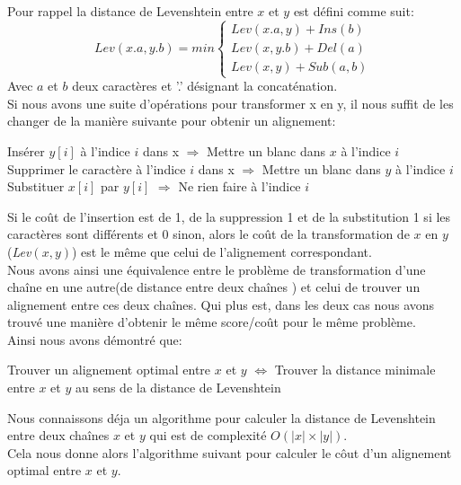 \documentclass{article}
\begin{document}
Pour rappel la distance de Levenshtein entre $x$ et $y$ est défini comme suit:
\begin{equation*}
	Lev(x.a,y.b)= min
		\begin{cases}
			Lev(x.a,y) + Ins(b)\\
			Lev(x,y.b) + Del(a)\\
			Lev(x,y) + Sub(a,b)
		\end{cases}
\end{equation*}
Avec $a$ et $b$ deux caractères et '.' désignant la concaténation.\\

Si nous avons une suite d'opérations pour transformer x en y, il nous suffit de
les changer de la manière suivante pour obtenir un alignement:
\begin{center}
	Insérer $y[i]$ à l'indice $i$ dans x  $\Rightarrow$ Mettre un blanc dans $x$ à l'indice $i$ \\
	Supprimer le caractère à l'indice $i$ dans x $\Rightarrow$ Mettre un blanc dans $y$ à l'indice $i$\\
	Substituer $x[i]$ par $y[i]$ $\Rightarrow$ Ne rien faire à l'indice $i$ 
\end{center}

Si le coût de l'insertion est de 1, de la suppression 1 et de la substitution 1 si
les caractères sont différents et 0 sinon, alors le coût de la transformation
de $x$ en $y$ (\textit{Lev}$(x,y)$) est le même que celui de l'alignement correspondant.\\

Nous avons ainsi une équivalence entre le problème de transformation d'une
chaîne en une autre(de distance entre deux chaînes ) et celui de trouver un 
alignement entre ces deux chaînes.
Qui plus est, dans les deux cas nous avons trouvé une manière d'obtenir le même
score/coût pour le même problème.\\
Ainsi nous avons démontré que:
\begin{center}
	Trouver un alignement optimal entre $x$ et $y$ $\Leftrightarrow$ Trouver
	la distance minimale entre $x$ et $y$ au sens de la distance de Levenshtein 
\end{center}

Nous connaissons déja un algorithme pour calculer la distance de Levenshtein
entre deux chaînes $x$ et $y$ qui est de complexité $O( \lvert x \rvert \times
\lvert y \rvert )$.\\
Cela nous donne alors l'algorithme suivant pour calculer le côut d'un
alignement optimal entre $x$ et $y$.
\end{document}
